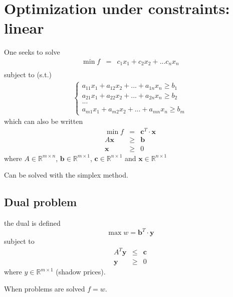 \section{Optimization under constraints: linear}
One seeks to solve
\begin{eqnarray}
	\min f &=& c_1x_1+c_2x_2+ ... c_nx_n\\
\end{eqnarray}
subject to (s.t.)
\begin{eqnarray}
	\begin{cases}
		a_{11}x_1+a_{12}x_2 + ... + a_{1n}x_n \geq b_1\\
		a_{21}x_1+a_{22}x_2 + ... + a_{2n}x_n \geq b_2\\
		...\\
		a_{m1}x_1+a_{m2}x_2 + ... + a_{mn}x_n \geq b_m
	\end{cases}
\end{eqnarray}
which can also be written
\begin{eqnarray}
	\min f &=& \mathbf{c}^T\cdot \mathbf{x}
	\\
	A \mathbf{x} &\geq& \mathbf{b}\\
	\mathbf{x}&\geq&0
\end{eqnarray}
where $A\in\mathbb R^{m\times n}$, $\mathbf{b}\in\mathbb R^{m\times1}$, $\mathbf{c}\in\mathbb R^{n\times 1}$ and $\mathbf{x}\in\mathbb R^{n\times 1}$


Can be solved with the simplex method.

\subsection{Dual problem}
the dual is defined
\begin{equation}
	\max w = \mathbf{b}^T\cdot\mathbf{y}
\end{equation}
subject to
\begin{eqnarray}
	A^T \mathbf{y} &\leq& \mathbf{c}\\
	\mathbf{y}&\geq&0
\end{eqnarray}
where $y\in\mathbb R^{m\times 1}$ (shadow prices).

When problems are solved $f = w$.


